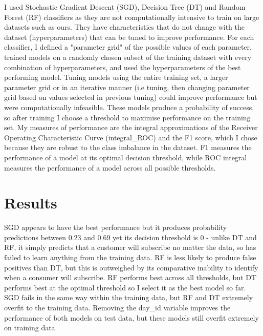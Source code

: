 \documentclass[9pt]{article}
\begin{document}
I used Stochastic Gradient Descent (SGD), Decision Tree (DT) and Random Forest (RF) classifiers as they are not computationally intensive to train on large datasets such as ours. They have characteristics that do not change with the dataset (hyperparameters) that can be tuned to improve performance. For each classifier, I defined a "parameter grid" of the possible values of each parameter, trained models on a randomly chosen subset of the training dataset with every combination of hyperparameters, and used the hyperparameters of the best performing model. Tuning models using the entire training set, a larger parameter grid or in an iterative manner (i.e tuning, then changing parameter grid based on values selected in previous tuning) could improve performance but were computationally infeasible. These models produce a probability of success, so after training I choose a threshold to maximise performance on the training set. My measures of performance are the integral approximations of the Receiver Operating Characteristic Curve (integral\_ROC) and the F1 score, which I chose because they are robust to the class imbalance in the dataset. F1 measures the performance of a model at its optimal decision threshold, while ROC integral measures the performance of a model across all possible thresholds.


\vspace{-0.25cm}
\section{Results}
\vspace{-0.25cm}
SGD appears to have the best performance but it produces probability predictions between 0.23 and 0.69 yet its decision threshold is 0 - unlike DT and RF, it simply predicts that a customer will subscribe no matter the data, so has failed to learn anything from the training data.
RF is less likely to produce false positives than DT, but this is outweighed by its comparative inability to identify when a consumer will subscribe. RF performs best across all thresholds, but DT performs best at the optimal threshold so I select it as the best model so far.
SGD fails in the same way within the training data, but RF and DT extremely overfit to the training data. Removing the day\_id variable improves the performance of both models on test data, but these models still overfit extremely on training data. 

\vspace{-0.25cm}
\end{document}
